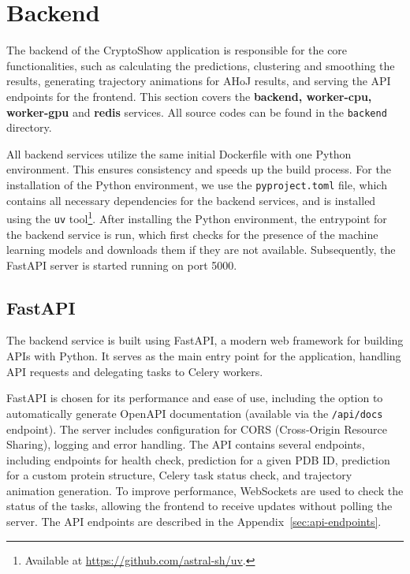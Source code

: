 \section{Backend}
\label{sec:backend}

The backend of the CryptoShow application is responsible for the core functionalities, such as calculating the predictions, clustering and smoothing the results, generating trajectory animations for AHoJ results, and serving the API endpoints for the frontend. This section covers the \textbf{backend, worker-cpu, worker-gpu} and \textbf{redis} services. All source codes can be found in the \lstinline!backend! directory.

All backend services utilize the same initial Dockerfile with one Python environment. This ensures consistency and speeds up the build process. For the installation of the Python environment, we use the \lstinline!pyproject.toml! file, which contains all necessary dependencies for the backend services, and is installed using the \lstinline|uv| tool\footnote{Available at \url{https://github.com/astral-sh/uv}.}. After installing the Python environment, the entrypoint for the backend service is run, which first checks for the presence of the machine learning models and downloads them if they are not available. Subsequently, the FastAPI server is started running on port 5000.

\subsection{FastAPI}
\label{sec:fastapi}

The backend service is built using FastAPI, a modern web framework for building APIs with Python. It serves as the main entry point for the application, handling API requests and delegating tasks to Celery workers.

FastAPI is chosen for its performance and ease of use, including the option to automatically generate OpenAPI documentation (available via the \lstinline|/api/docs| endpoint). The server includes configuration for CORS (Cross-Origin Resource Sharing), logging and error handling. The API contains several endpoints, including endpoints for health check, prediction for a given PDB ID, prediction for a custom protein structure, Celery task status check, and trajectory animation generation. To improve performance, WebSockets are used to check the status of the tasks, allowing the frontend to receive updates without polling the server. The API endpoints are described in the Appendix~\ref{sec:api-endpoints}.

